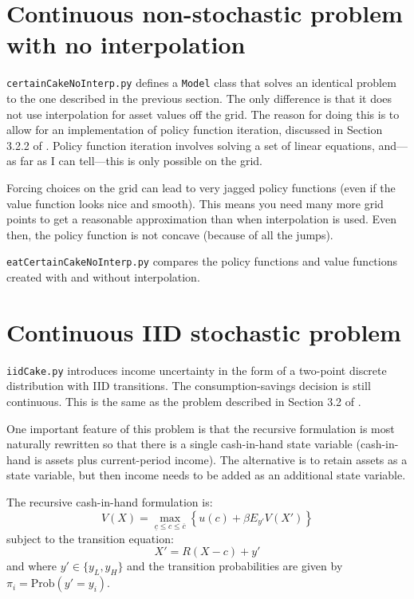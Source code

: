 \documentclass[12pt]{article}
\begin{document}
\section{Continuous non-stochastic problem with no interpolation}

\texttt{certainCakeNoInterp.py} defines a \texttt{Model} class that solves an identical problem to the one described in the previous section. The only difference is that it does not use interpolation for asset values off the grid. The reason for doing this is to allow for an implementation of policy function iteration, discussed in Section 3.2.2 of \citet{adda2003dynamic}. Policy function iteration involves solving a set of linear equations, and---as far as I can tell---this is only possible on the grid.

Forcing choices on the grid can lead to very jagged policy functions (even if the value function looks nice and smooth). This means you need many more grid points to get a reasonable approximation than when interpolation is used. Even then, the policy function is not concave (because of all the jumps).

\texttt{eatCertainCakeNoInterp.py} compares the policy functions and value functions created with and without interpolation.

\section{Continuous IID stochastic problem}

\texttt{iidCake.py} introduces income uncertainty in the form of a two-point discrete distribution with IID transitions. The consumption-savings decision is still continuous. This is the same as the problem described in Section 3.2 of \citet{adda2003dynamic}.

One important feature of this problem is that the recursive formulation is most naturally rewritten so that there is a single cash-in-hand state variable (cash-in-hand is assets plus current-period income). The alternative is to retain assets as a state variable, but then income needs to be added as an additional state variable.

The recursive cash-in-hand formulation is:
\begin{equation}
	V(X) = \max_{\underline{c} \leq c \leq \overline{c}} \left\{ u(c) + \beta E_{y'} V(X') \right\}
\end{equation}
subject to the transition equation:
\begin{equation}
	X' = R (X - c) + y'
\end{equation}
and where \(y' \in \{y_L, y_H\}\) and the transition probabilities are given by \(\pi_{i} = \text{Prob}(y' = y_i)\).
\end{document}
